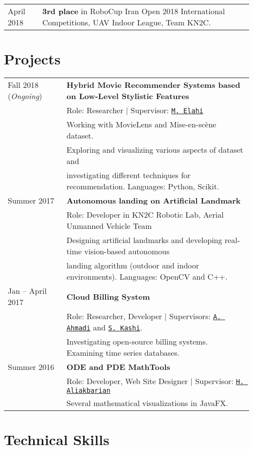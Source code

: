 \documentclass[letterpaper]{article}
\begin{document}
{\renewcommand{\arraystretch}{1.2}
\begin{tabular}{l l}
April 2018 & \textbf{3rd place} in RoboCup Iran Open 2018 International Competitions, UAV Indoor League, Team KN2C.
\end{tabular}
\section*{Projects}

{\renewcommand{\arraystretch}{1.2}
\begin{tabular}{l l}
Fall 2018 (\textit{Ongoing}) & \textbf{Hybrid Movie Recommender Systems based on Low-Level Stylistic Features} \\ & Role: Researcher | Supervisor: \href{https://scholar.google.com/citations?user=aUWF7LYAAAAJ&hl=en}{\tt M. Elahi} \\&Working with MovieLens  and Mise-en-scène dataset. \\&Exploring and visualizing various aspects of dataset and\\& investigating different techniques for recommendation. Languages: Python, Scikit.
\\
Summer 2017 & \textbf{Autonomous landing on Artificial Landmark} \\ & Role: Developer in KN2C Robotic Lab, Aerial Unmanned Vehicle Team \\&Designing artificial landmarks and developing real-time vision-based autonomous \\& landing algorithm (outdoor and indoor environments). Languages: OpenCV and C++.
\\
Jan – April 2017 & \textbf{Cloud Billing System} \\& Role: Researcher, Developer | Supervisors: \href{http://wp.kntu.ac.ir/ahmadi/}{\tt A. Ahmadi} and \href{http://wp.kntu.ac.ir/sedighian/}{\tt  S. Kashi}.
\\&
Investigating open-source billing systems. Examining time series databases.
\\
Summer 2016 &  \textbf{ODE and PDE MathTools} \\&
Role: Developer, Web Site Designer | Supervisor: \href{http://wp.kntu.ac.ir/aliakbarian/}{\tt H. Aliakbarian} \\&
Several mathematical visualizations in JavaFX.

\end{tabular}

\section*{Technical Skills}

}}
\end{document}
